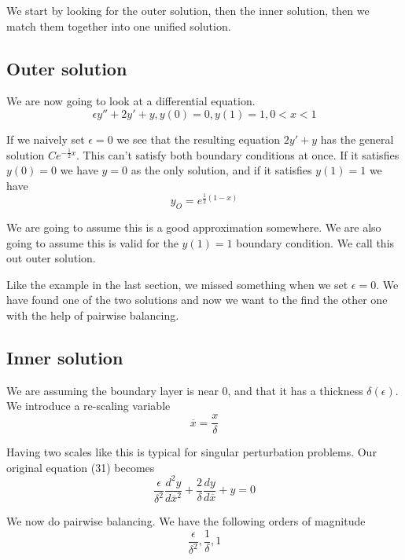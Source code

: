 \documentclass[12pt]{article}
\begin{document}
We start by looking for the outer solution, then the inner solution,
then we match them together into one unified solution.

\subsection{Outer solution}

We are now going to look at a differential equation.
\begin{equation}
\epsilon y'' + 2 y' + y, y(0)=0, y(1)=1, 0 < x < 1
\end{equation}

If we naively set $\epsilon = 0$ we see that the resulting equation $2 y' + y$
has the general solution $C e^{- \frac{1}{2}x}$. This can't satisfy both
boundary conditions at once. If it satisfies $y(0)=0$ we have $y=0$ as the only
solution, and if it satisfies $y(1)=1$ we have
\begin{equation}
y_O=e^{\frac{1}{2} (1 - x)}
\end{equation}

We are going to assume this is a good approximation somewhere. We are also going
to assume this is valid for the $y(1)=1$ boundary condition. We call this out
outer solution.

Like the example in the last section, we missed something when we set $\epsilon
= 0$. We have found one of the two solutions and now we want to the find the
other one with the help of pairwise balancing.

\subsection{Inner solution}

We are assuming the boundary layer is near 0, and that it has a thickness
$\delta(\epsilon)$. We introduce a re-scaling variable
\begin{equation}
\overline{x} = \frac{x}{\delta}
\end{equation}

Having two scales like this is typical for singular perturbation problems. Our
original equation (31) becomes
\begin{equation}
\frac{\epsilon}{\delta^2} \frac{d^2y}{d\overline{x}^2} + \frac{2}{\delta}
\frac{dy}{d\overline{x}} + y = 0
\end{equation}

We now do pairwise balancing. We have the following orders of
magnitude
\begin{equation}
\frac{\epsilon}{\delta^2}, \frac{1}{\delta}, 1
\end{equation}
\end{document}
